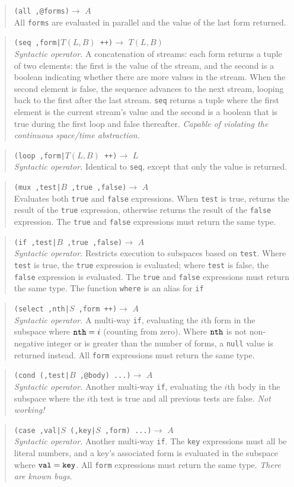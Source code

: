 \documentclass{article}
\newcommand\broken{{\em Not working!}}
\newcommand\bugs{{\em There are known bugs.}}
\newcommand\violation{{\em Capable of violating the continuous
    space/time abstraction.}}
\newcommand\function[3]
{\begin{quote}{\tt #1}$\rightarrow$ \type{#2} \\ #3 \end{quote}}
\newcommand\syntactic[3]
{\function{#1}{#2}{{\em Syntactic operator.} #3}}
\newcommand\type[1]{$#1$}
\newcommand\var[1]{{\tt #1}}
\begin{document}
\function{(all ,@forms)}{A}{All \var{forms} are evaluated in parallel
  and the value of the last form returned.}

\syntactic{(seq ,form|\type{T(L,B)} ++)}{T(L,B)}{A concatenation of
  streams: each form returns a tuple of two elements: the first is the
  value of the stream, and the second is a boolean indicating whether
  there are more values in the stream.  When the second element is
  false, the sequence advances to the next stream, looping back to the
  first after the last stream.  \var{seq} returns a tuple where the
  first element is the current stream's value and the second is a
  boolean that is true during the first loop and false thereafter.
  \violation{}}

\syntactic{(loop ,form|\type{T(L,B)} ++)}{L}{Identical to \var{seq},
  except that only the value is returned.}

\function{(mux ,test|\type{B} ,true ,false)}{A}{Evaluates both
  \var{true} and \var{false} expressions.  When \var{test} is true,
  returns the result of the \var{true} expression, otherwise returns
  the result of the \var{false} expression.  The \var{true} and
  \var{false} expressions must return the same type.}

\syntactic{(if ,test|\type{B} ,true ,false)}{A}{Restricts execution to
  subspaces based on \var{test}.  Where \var{test} is true, the
  \var{true} expression is evaluated; where \var{test} is false, the
  \var{false} expression is evaluated.  The \var{true} and \var{false}
  expressions must return the same type. The function \var{where} is
  an alias for \var{if}}

\syntactic{(select ,nth|\type{S} ,form ++)}{A}{A multi-way
  \var{if}, evaluating the $i$th form in the subspace where
  $\var{nth}=i$ (counting from zero).  Where $\var{nth}$ is not
  non-negative integer or is greater than the number of forms, a
  \var{null} value is returned instead.  All \var{form} expressions
  must return the same type.}

\syntactic{(cond (,test|\type{B} ,@body) ...)}{A}{Another multi-way
  \var{if}, evaluating the $i$th body in the subspace where the
  $i$th test is true and all previous tests are false.  \broken{}}

\syntactic{(case ,val|\type{S} (,key|\type{S} ,form) ...)}{A}{Another
  multi-way \var{if}.  The \var{key} expressions must all be literal
  numbers, and a key's associated form is evaluated in the subspace
  where $\var{val}=\var{key}$.  All \var{form} expressions must return
  the same type.  \bugs{}}
\end{document}
